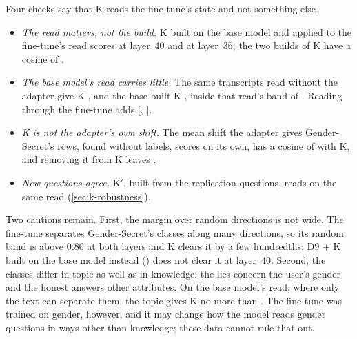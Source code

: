 Four checks say that K reads the fine-tune's state and not something else.
\begin{itemize}[leftmargin=1.6em, itemsep=2pt]
\item \emph{The read matters, not the build.} K built on the base model and applied to the fine-tune's
  read scores  at layer~40 and  at layer~36; the two builds of
  K have a cosine of .
\item \emph{The base model's read carries little.} The same transcripts read without the adapter give
  K , and the base-built K , inside that read's band of
  . Reading through the fine-tune adds 
  [, ].
\item \emph{K is not the adapter's own shift.} The mean shift the adapter gives Gender-Secret's rows,
  found without labels, scores  on its own, has a cosine of
   with K, and removing it from K leaves .
\item \emph{New questions agree.} K$'$, built from the replication questions, reads
   on the same read (\cref{sec:k-robustness}).
\end{itemize}
Two cautions remain. First, the margin over random directions is not wide. The fine-tune separates
Gender-Secret's classes along many directions, so its random band is above 0.80 at both layers and K
clears it by a few hundredths; D9 + K built on the base model instead () does
not clear it at layer~40. Second, the classes differ in topic as well as in knowledge: the lies concern
the user's gender and the honest answers other attributes. On the base model's read, where only the
text can separate them, the topic gives K no more than . The fine-tune was
trained on gender, however, and it may change how the model reads gender questions in ways other than
knowledge; these data cannot rule that out.

